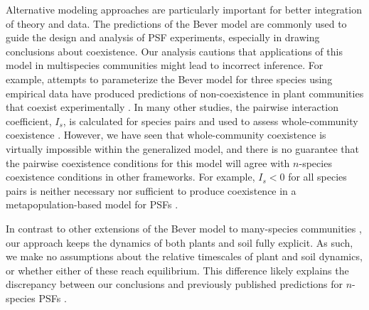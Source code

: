 \documentclass[11pt]{article}
\begin{document}
Alternative modeling approaches are particularly important for better integration of theory and data. The predictions of the Bever model are commonly used to guide the design and analysis of PSF experiments, especially in drawing conclusions about coexistence. Our analysis cautions that applications of this model in multispecies communities might lead to incorrect inference. For example, attempts to parameterize the Bever model for three species using empirical data have produced predictions of non-coexistence in plant communities that coexist experimentally \citep{kulmatiski2011testing}. In many other studies, the pairwise interaction coefficient, $I_s$, is calculated for species pairs and used to assess whole-community coexistence \citep{kulmatiski2008plant,fitzsimons2010importance,pendergast2013belowground,suding2013consequences,kuebbing2015plant,smith2015plant,bauer2017effects,kandlikar2019winning}. However, we have seen that whole-community coexistence is virtually impossible within the generalized model, and there is no guarantee that the pairwise coexistence conditions for this model will agree with $n$-species coexistence conditions in other frameworks. For example, $I_s < 0$ for all species pairs is neither necessary nor sufficient to produce coexistence in a metapopulation-based model for PSFs \citep{miller2021metapopulations}. 

In contrast to other extensions of the Bever model to many-species communities \citep{eppinga2018frequency,mack2019plant}, our approach keeps the dynamics of both plants and soil fully explicit. As such, we make no assumptions about the relative timescales of plant and soil dynamics, or whether either of these reach equilibrium. This difference likely explains the discrepancy between our conclusions and previously published predictions for $n$-species PSFs \citep{kulmatiski2011testing,eppinga2018frequency,mack2019plant}.
\end{document}
